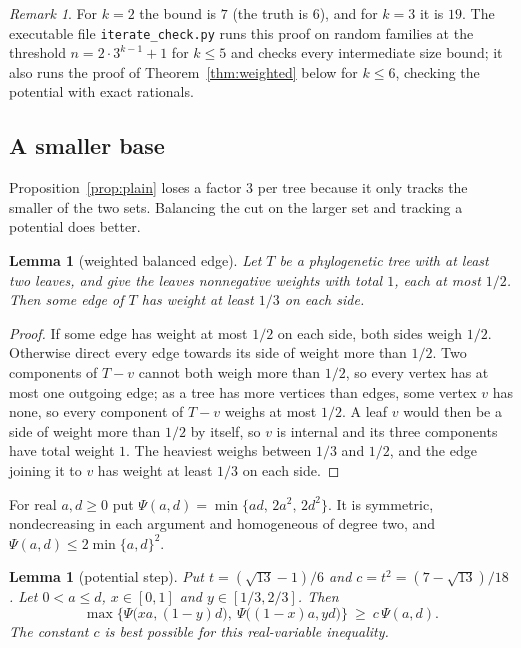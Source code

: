 \documentclass[11pt]{amsart}
\newtheorem{lemma}[theorem]{Lemma}
\theoremstyle{remark}
\newtheorem{remark}[theorem]{Remark}
\begin{document}
\begin{remark}
For $k=2$ the bound is $7$ (the truth is $6$), and for $k=3$ it is $19$. The executable file \texttt{iterate\_check.py} runs this proof on random families at the threshold $n=2\cdot3^{k-1}+1$ for $k\le5$ and checks every intermediate size bound; it also runs the proof of Theorem~\ref{thm:weighted} below for $k\le6$, checking the potential with exact rationals.
\end{remark}

\subsection*{A smaller base}
Proposition~\ref{prop:plain} loses a factor $3$ per tree because it only tracks the smaller of the two sets. Balancing the cut on the larger set and tracking a potential does better.

\begin{lemma}[weighted balanced edge]\label{lem:weighted}
Let $T$ be a phylogenetic tree with at least two leaves, and give the leaves nonnegative weights with total $1$, each at most $1/2$. Then some edge of $T$ has weight at least $1/3$ on each side.
\end{lemma}

\begin{proof}
If some edge has weight at most $1/2$ on each side, both sides weigh $1/2$. Otherwise direct every edge towards its side of weight more than $1/2$. Two components of $T-v$ cannot both weigh more than $1/2$, so every vertex has at most one outgoing edge; as a tree has more vertices than edges, some vertex $v$ has none, so every component of $T-v$ weighs at most $1/2$. A leaf $v$ would then be a side of weight more than $1/2$ by itself, so $v$ is internal and its three components have total weight $1$. The heaviest weighs between $1/3$ and $1/2$, and the edge joining it to $v$ has weight at least $1/3$ on each side.
\end{proof}

For real $a,d\ge0$ put $\Psi(a,d)=\min\{ad,\,2a^2,\,2d^2\}$. It is symmetric, nondecreasing in each argument and homogeneous of degree two, and $\Psi(a,d)\le2\min\{a,d\}^2$.

\begin{lemma}[potential step]\label{lem:potential}
Put $t=(\sqrt{13}-1)/6$ and $c=t^2=(7-\sqrt{13})/18$. Let $0<a\le d$, $x\in[0,1]$ and $y\in[1/3,2/3]$. Then
\[
\max\bigl\{\Psi\bigl(xa,(1-y)d\bigr),\ \Psi\bigl((1-x)a,yd\bigr)\bigr\}\ \ge\ c\,\Psi(a,d).
\]
The constant $c$ is best possible for this real-variable inequality.
\end{lemma}
\end{document}
